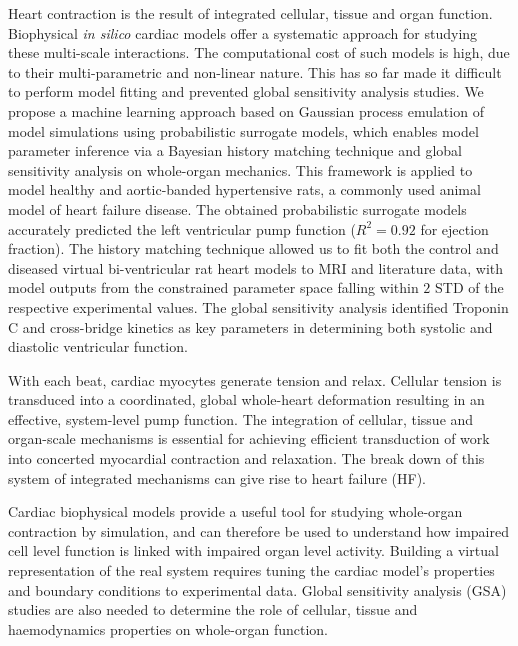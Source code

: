 \vspace{0.2cm}
Heart contraction is the result of integrated cellular, tissue and organ function. Biophysical \textit{in silico} cardiac models offer a systematic approach for studying these multi-scale interactions. The computational cost of such models is high, due to their multi-parametric and non-linear nature. This has so far made it difficult to perform model fitting and prevented global sensitivity analysis studies. We propose a machine learning approach based on Gaussian process emulation of model simulations using probabilistic surrogate models, which enables model parameter inference via a Bayesian history matching technique and global sensitivity analysis on whole-organ mechanics. This framework is applied to model healthy and aortic-banded hypertensive rats, a commonly used animal model of heart failure disease. The obtained probabilistic surrogate models accurately predicted the left ventricular pump function ($R^2=0.92$ for ejection fraction). The history matching technique allowed us to fit both the control and diseased virtual bi-ventricular rat heart models to MRI and literature data, with model outputs from the constrained parameter space falling within $2$ STD of the respective experimental values. The global sensitivity analysis identified Troponin C and cross-bridge kinetics as key parameters in determining both systolic and diastolic ventricular function.

\vspace{0.2cm}
With each beat, cardiac myocytes generate tension and relax. Cellular tension is transduced into a coordinated, global whole-heart deformation resulting in an effective, system-level pump function. The integration of cellular, tissue and organ-scale mechanisms is essential for achieving efficient transduction of work into concerted myocardial contraction and relaxation. The break down of this system of integrated mechanisms can give rise to heart failure (HF). 

Cardiac biophysical models provide a useful tool for studying whole-organ contraction \cite{Niederer:2019} by simulation, and can therefore be used to understand how impaired cell level function is linked with impaired organ level activity. Building a virtual representation of the real system requires tuning the cardiac model's properties and boundary conditions to experimental data. Global sensitivity analysis (GSA) studies are also needed to determine the role of cellular, tissue and haemodynamics properties on whole-organ function.

